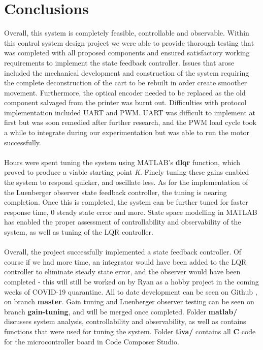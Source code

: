 \documentclass[12pt]{article}
\begin{document}
\section{Conclusions}
Overall, this system is completely feasible, controllable and observable. Within this control system design project we were able to provide thorough testing that was completed with all proposed components and ensured satisfactory working requirements to implement the state feedback controller. Issues that arose included the mechanical development and construction of the system requiring the complete deconstruction of the cart to be rebuilt in order create smoother movement. Furthermore, the optical encoder needed to be replaced as the old component salvaged from the printer was burnt out. Difficulties with protocol implementation included UART and PWM. UART was difficult to implement at first but was soon remedied after further research, and the PWM load cycle took a while to integrate during our experimentation but was able to run the motor successfully.
\\\\
Hours were spent tuning the system using MATLAB's \textbf{dlqr} function, which proved to produce a viable starting point \textit{K}. Finely tuning these gains enabled the system to respond quicker, and oscillate less. As for the implementation of the Luenberger observer state feedback controller, the tuning is nearing completion. Once this is completed, the system can be further tuned for faster response time, 0 steady state error and more. State space modelling in MATLAB has enabled the proper assessment of controllability and observability of the system, as well as tuning of the LQR controller.
\\\\
Overall, the project successfully implemented a state feedback controller. Of course if we had more time, an integrator would have been added to the LQR controller to eliminate steady state error, and the observer would have been completed - this will still be worked on by Ryan as a hobby project in the coming weeks of COVID-19 quarantine. All to date development can be seen on Github \cite{github}, on branch \textbf{master}. Gain tuning and Luenberger observer testing can be seen on branch \textbf{gain-tuning}, and will be merged once completed. Folder \textbf{matlab/} discusses system analysis, controllability and observability, as well as contains functions that were used for tuning the system. Folder \textbf{tiva/} contains all \textbf{C} code for the microcontroller board in Code Composer Studio.
\end{document}
